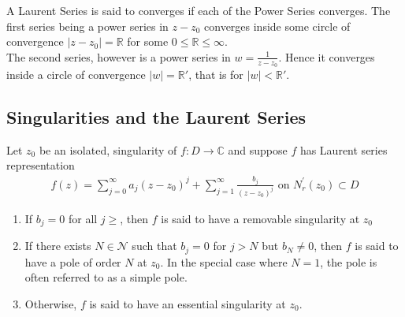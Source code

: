 \documentclass[12pt]{report}
\newcommand{\sprime}{'}
\newcommand{\dsp}{\displaystyle}
\newcommand{\NI}{\noindent}
\newcommand{\real}{ \mathbb{R}}
\newcommand{\complex}{\mathbb{C}}
\begin{document}
	\NI A Laurent Series is said to converges if each of the Power Series converges. The first series being a power series in $z-z_0$ converges inside some circle of convergence $|z-z_0|=\real$ for some $0\leq \real \leq \infty$.\\
	The second series, however is a power series in $\dsp w = \frac{1}{z-z_0}$. Hence it converges inside a circle of convergence $|w|=\real\sprime$, that is for $|w|<\real\sprime$.

	\subsection{Singularities and the Laurent Series}
	Let $z_0$ be an isolated, singularity of $f:D\rightarrow\complex$ and suppose $f$ has Laurent series representation
	\begin{eqnarray}
		f(z) = \sum_{j=0}^{\infty}a_j(z-z_0)^j + \sum_{j=1}^{\infty}\frac{b_j}{(z-z_0)^j} \text{ on } N_r^{\sprime}(z_0) \subset D
	\end{eqnarray}
	
	\begin{enumerate}
		\item If $b_j=0$ for all $j\geq $, then $f$ is said to have a removable singularity at $z_0$
		\item If there exists $N\in\mathcal{N}$ such that $b_j=0$ for $j>N$ but $b_N\neq 0 $, then $f$ is said to have a pole of order $N$ at $z_0$. In the special case where $N=1$, the pole is often referred to as a simple pole.
		\item Otherwise, $f$ is said to have an essential singularity at $z_0$. 
	\end{enumerate}
	
\end{document}
